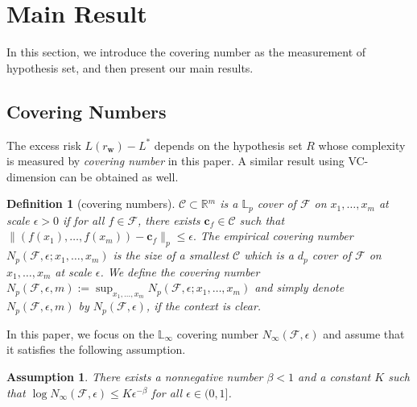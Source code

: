 \documentclass[letterpaper]{article} %
\newtheorem{definition}{Definition}
\newtheorem{assumption}{Assumption}
\newcommand{\weight}{\mathbf{w}}
\newcommand{\real}{\mathbb{R}}
\newcommand{\bayeserror}{L^*}
\newcommand{\risk}{L}
\newcommand{\lebesgue}{\mathbb{L}}
\newcommand{\complexbound}{\beta}
\newcommand{\citep}[3]{(#1\ \citeauthor{#3}\ \citeyear{#3},\ #2)}
\begin{document}
\section{Main Result} %
\label{sec:risk_bounds}
In this section, we introduce the covering number as the measurement of hypothesis set, and then present our main results.

\subsection{Covering Numbers} %
\label{sub:covering number}
The excess risk $\risk{}(r_\weight{})-\bayeserror{}$ depends on the hypothesis set $R$ whose complexity is measured by \emph{covering number} \cite{cucker2007learning} in this paper. 
A similar result using VC-dimension \cite{vapnik1971uniform} can be obtained as well. 
\begin{definition}[covering numbers]
$\mathcal{C}\subset \real{}^m$ is a $\lebesgue{}_p$ \emph{cover} of $\mathcal{F}$ on $x_1,\dots,x_m$ at scale $\epsilon>0$ if for all $f\in\mathcal{F}$, there exists $\mathbf{c}_f\in \mathcal{C}$ such that
$\|(f(x_1),\dots,f(x_m))-\mathbf{c}_f\|_p\le \epsilon.$
The empirical covering number $N_p(\mathcal{F},\epsilon;x_1,\dots,x_m)$ is the size of a smallest $\mathcal{C}$ which is a $d_p$ cover of $\mathcal{F}$ on $x_1,\dots,x_m$ at scale $\epsilon$.
We define the covering number $N_p(\mathcal{F},\epsilon,m):=\sup_{x_1,\dots,x_m}N_p(\mathcal{F},\epsilon;x_1,\dots,x_m)$ and simply denote $N_p(\mathcal{F},\epsilon,m)$ by $N_p(\mathcal{F},\epsilon)$, if the context is clear.
\end{definition}
In this paper, we focus on the $\lebesgue_\infty$ covering number $N_\infty(\mathcal{F},\epsilon)$ and assume that it satisfies the following assumption.
\begin{assumption}\label{ass:covering_number} There exists a nonnegative number $\complexbound < 1$ and a constant $K$ such that $\log N_\infty(\mathcal{F},\epsilon) \le K\epsilon^{-\complexbound}$ for all $\epsilon\in (0,1]$.
\end{assumption}
\end{document}
